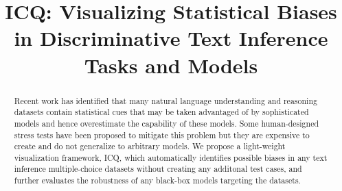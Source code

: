 \documentclass[conference]{IEEEtran}
\begin{document}
\title{ICQ: Visualizing Statistical Biases in Discriminative Text Inference Tasks and Models}

\author{
\and
{}
}


\maketitle
\begin{abstract}
Recent work has identified that many natural language understanding and 
reasoning datasets contain statistical cues that
may be taken advantaged of by sophisticated models and hence overestimate the 
capability of these models. 
Some human-designed stress tests have been proposed to mitigate this problem
but they are expensive to create and do not generalize to arbitrary models. 
We propose a light-weight visualization framework, ICQ, 
which automatically identifies possible biases
in any text inference multiple-choice datasets without creating any additonal
test cases, and further evaluates
the robustness of any black-box models targeting the datasets. 
\end{abstract}












\end{document}
